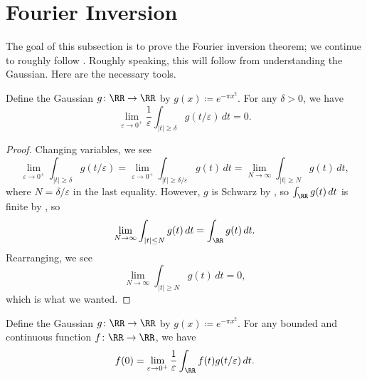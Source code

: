 \documentclass[notes.tex]{subfiles}
\begin{document}
\section{Fourier Inversion}
The goal of this subsection is to prove the Fourier inversion theorem; we continue to roughly follow \cite[Chapter~5]{stein-fourier-analysis}. Roughly speaking, this will follow from understanding the Gaussian. Here are the necessary tools.
\begin{lemma} \label{lem:gaussian-concentrates}
	Define the Gaussian $g\colon\RR\to\RR$ by $g(x)\coloneqq e^{-\pi x^2}$. For any $\delta>0$, we have
	\[\lim_{\varepsilon\to0^+}\frac1\varepsilon\int_{|t|\ge\delta}g(t/\varepsilon)\,dt=0.\]
\end{lemma}
\begin{proof}
	Changing variables, we see
	\[\lim_{\varepsilon\to0^+}\int_{|t|\ge\delta}g(t/\varepsilon)=\lim_{\varepsilon\to0^+}\int_{|t|\ge\delta/\varepsilon}g(t)\,dt=\lim_{N\to\infty}\int_{|t|\ge N}g(t)\,dt,\]
	where $N=\delta/\varepsilon$ in the last equality. However, $g$ is Schwarz by , so $\int_\RR g(t)\,dt$ is finite by , so
	\[\lim_{N\to\infty}\int_{|t|\le N}g(t)\,dt=\int_\RR g(t)\,dt.\]
	Rearranging, we see
	\[\lim_{N\to\infty}\int_{|t|\ge N}g(t)\,dt=0,\]
	which is what we wanted.
\end{proof}
\begin{lemma} \label{lem:use-gaussian-concentrates}
	Define the Gaussian $g\colon\RR\to\RR$ by $g(x)\coloneqq e^{-\pi x^2}$. For any bounded and continuous function $f\colon\RR\to\RR$, we have
	\[f(0)=\lim_{\varepsilon\to0^+}\frac1\varepsilon\int_\RR f(t)g(t/\varepsilon)\,dt.\]
\end{lemma}
\end{document}
